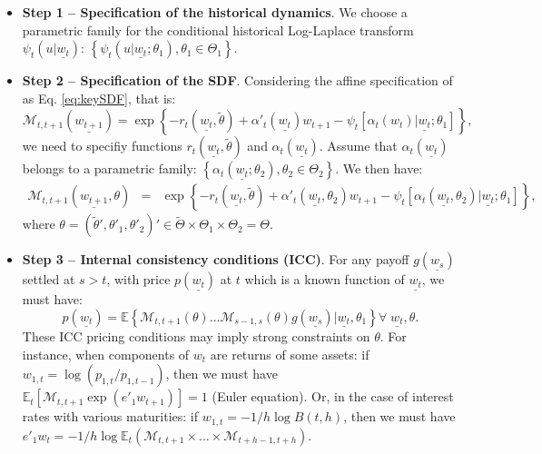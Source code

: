 \documentclass[
  12pt,
]{book}
\providecommand{\tightlist}{%
  \setlength{\itemsep}{0pt}\setlength{\parskip}{0pt}}
\theoremstyle{definition}
\theoremstyle{definition}
\theoremstyle{definition}
\theoremstyle{definition}
\theoremstyle{remark}
\begin{document}
\begin{itemize}
\tightlist
\item
  \textbf{Step 1 -- Specification of the historical dynamics}. We choose a parametric family for the conditional historical Log-Laplace transform \(\psi_t(u|\underline{w_t})\): \(\left\{ \psi_t (u|\underline{w_t} ; \theta_1), \theta_1 \in \Theta_1 \right\}\).
\item
  \textbf{Step 2 -- Specification of the SDF}. Considering the affine specification of as Eq. \eqref{eq:keySDF}, that is:
  \[
  \mathcal{M}_{t,t+1} (\underline{w_{t+1}}) = \exp\left\{ -r_{t}(\underline{w_t}, \tilde{\theta}) + \alpha'_t(\underline{w_t})w_{t+1} - \psi_t [\alpha_t (w_t)|\underline{w_t} ; \theta_1]\right\},
  \]
  we need to specifiy functions \(r_{t}(\underline{w_t}, \tilde{\theta})\) and \(\alpha_t(\underline{w_t})\). Assume that \(\alpha_t(\underline{w_t})\) belongs to a parametric family: \(\left\{ \alpha_t (\underline{w_t} ; \theta_2),\theta_2 \in \Theta_2 \right\}\).
  We then have:
  \begin{eqnarray*}
  \mathcal{M}_{t,t+1}(\underline{w_{t+1}}, \theta) &=& \exp \left\{ - r_{t}
  (\underline{w_t}, \tilde{\theta}) + \alpha'_t (\underline{w_t},\theta_2) w_{t+1} - \psi_{t} \left[ \alpha_t (\underline{w_t},
  \theta_2) | \underline{w_t} ; \theta_1 \right] \right\},
  \end{eqnarray*}
  where \(\theta = (\tilde{\theta}', \theta'_1,\theta'_2)' \in \tilde{\Theta}\times \Theta_1 \times \Theta_2 = \Theta\).
\item
  \textbf{Step 3 -- Internal consistency conditions (ICC)}. For any payoff \(g(\underline{w_s})\) settled at \(s>t\), with price \(p(\underline{w_t})\) at \(t\) which is a known function of
  \(\underline{w_t}\), we must have:
  \begin{equation*}
  p(\underline{w_t}) = \mathbb{E} \left\{\mathcal{M}_{t,t+1} (\theta) \dots \mathcal{M}_{s-1,s} (\theta) g(\underline{w_s})  |  \underline{w_t},
  \theta_1 \right\}    \forall \; \underline{w_t}, \theta.\label{eq:ICCgen}
  \end{equation*}
  These ICC pricing conditions may imply strong constraints on \(\theta\). For instance, when components of \(w_t\) are returns of some assets: if \(w_{1,t} = \log(p_{1,t}/p_{1,t-1})\), then we must have \(\mathbb{E}_t [\mathcal{M}_{t,t+1} \exp (e'_1 w_{t+1})]= 1\) (Euler equation). Or, in the case of interest rates with various maturities: if \(w_{1,t} = -1/h\log B(t,h)\), then we must have \(e'_1 w_{t} = - 1/h \log \mathbb{E}_t (\mathcal{M}_{t,t+1}\times \dots \times \mathcal{M}_{t+h-1,t+h})\).
\end{itemize}
\end{document}
